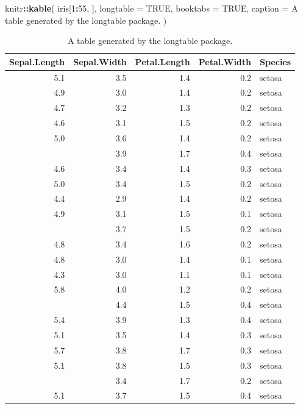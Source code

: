 \documentclass[
  12pt,
]{krantz}
\newenvironment{Shaded}{\begin{snugshade}}{\end{snugshade}}
\newcommand{\AttributeTok}[1]{\textcolor[rgb]{0.13,0.29,0.53}{#1}}
\newcommand{\ConstantTok}[1]{\textcolor[rgb]{0.56,0.35,0.01}{#1}}
\newcommand{\DecValTok}[1]{\textcolor[rgb]{0.00,0.00,0.81}{#1}}
\newcommand{\FunctionTok}[1]{\textcolor[rgb]{0.13,0.29,0.53}{\textbf{#1}}}
\newcommand{\NormalTok}[1]{#1}
\newcommand{\SpecialCharTok}[1]{\textcolor[rgb]{0.81,0.36,0.00}{\textbf{#1}}}
\newcommand{\StringTok}[1]{\textcolor[rgb]{0.31,0.60,0.02}{#1}}
\theoremstyle{definition}
\theoremstyle{definition}
\theoremstyle{definition}
\theoremstyle{definition}
\theoremstyle{remark}
\begin{document}
\begin{Shaded}
\begin{Highlighting}[]
\NormalTok{knitr}\SpecialCharTok{::}\FunctionTok{kable}\NormalTok{(}
\NormalTok{  iris[}\DecValTok{1}\SpecialCharTok{:}\DecValTok{55}\NormalTok{, ], }\AttributeTok{longtable =} \ConstantTok{TRUE}\NormalTok{, }\AttributeTok{booktabs =} \ConstantTok{TRUE}\NormalTok{,}
  \AttributeTok{caption =} \StringTok{\textquotesingle{}A table generated by the longtable package.\textquotesingle{}}
\NormalTok{)}
\end{Highlighting}
\end{Shaded}

\begin{longtable}[t]{rrrrl}
\caption{\label{tab:longtable}A table generated by the longtable package.}\\
\toprule
Sepal.Length & Sepal.Width & Petal.Length & Petal.Width & Species\\
\midrule
5.1 & 3.5 & 1.4 & 0.2 & setosa\\
4.9 & 3.0 & 1.4 & 0.2 & setosa\\
4.7 & 3.2 & 1.3 & 0.2 & setosa\\
4.6 & 3.1 & 1.5 & 0.2 & setosa\\
5.0 & 3.6 & 1.4 & 0.2 & setosa\\
\addlinespace
5.4 & 3.9 & 1.7 & 0.4 & setosa\\
4.6 & 3.4 & 1.4 & 0.3 & setosa\\
5.0 & 3.4 & 1.5 & 0.2 & setosa\\
4.4 & 2.9 & 1.4 & 0.2 & setosa\\
4.9 & 3.1 & 1.5 & 0.1 & setosa\\
\addlinespace
5.4 & 3.7 & 1.5 & 0.2 & setosa\\
4.8 & 3.4 & 1.6 & 0.2 & setosa\\
4.8 & 3.0 & 1.4 & 0.1 & setosa\\
4.3 & 3.0 & 1.1 & 0.1 & setosa\\
5.8 & 4.0 & 1.2 & 0.2 & setosa\\
\addlinespace
5.7 & 4.4 & 1.5 & 0.4 & setosa\\
5.4 & 3.9 & 1.3 & 0.4 & setosa\\
5.1 & 3.5 & 1.4 & 0.3 & setosa\\
5.7 & 3.8 & 1.7 & 0.3 & setosa\\
5.1 & 3.8 & 1.5 & 0.3 & setosa\\
\addlinespace
5.4 & 3.4 & 1.7 & 0.2 & setosa\\
5.1 & 3.7 & 1.5 & 0.4 & setosa\\

\end{longtable}
\end{document}
